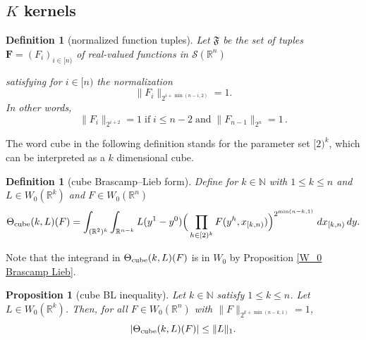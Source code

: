 \documentclass[12pt,reqno]{amsart}
\theoremstyle{plain}
\newtheorem{proposition}[theorem]{Proposition}
\newtheorem{definition}[theorem]{Definition}
\numberwithin{equation}{section}
\theoremstyle{remark}
\newcommand{\uses}[1]{}
\newcommand{\usesdefs}[1]{}
\newcommand{\R}{{\mathbb R}}
\newcommand{\N}{{\mathbb N}}
\newcommand{\F}{\mathbf{F}}
\begin{document}
\subsection{\texorpdfstring{$K$ kernels}{K kernels}}


\begin{definition}[normalized function tuples]\label{normalized function tuples}\uses{}\usesdefs{}
 Let $\mathfrak{F}$ be the set of tuples
$\F=(F_i)_{i\in [n)}$ of real-valued functions in $\mathcal{S}(\R^n)$


satisfying for $i\in [n)$ the normalization
 \begin{equation}\label{auto:normalized-function-tuple} \|F_{i}\|_{2^{i+\min(n-i,2)}}=1. \end{equation}
In other words,
 \begin{equation}\label{f-normalization}
  \|F_{i}\|_{2^{i+2}}=1\;\text{if}\;i\le n-2\;\text{and}\;\|F_{n-1}\|_{2^{n}}=1  \, .
 \end{equation}

\end{definition}


The word cube in the following definition stands for the parameter set $[2)^k$, which can be interpreted as a $k$ dimensional cube.

\begin{definition}[cube Brascamp--Lieb form]\label{cube Brascamp--Lieb}\uses{W_0 Brascamp Lieb}\usesdefs{auto:Wiener-space-definition}
Define for $k\in\N$ with $1 \le k\le  n$
and  $L\in W_0(\R^k)$ and $F\in W_0(\R^n)$
\begin{equation}\label{auto:cube-Brascamp-Lieb-form} \Theta_{{\rm cube}}(k,L)(F) = \int_{(\R^2)^k} \int_{\R^{n-k}} L(y^1-y^0) \Big(\prod_{h\in [2)^k} F(y^h, x_{[k,n)})\Big)^{2^{\min(n-k,1)}}\;dx_{[k,n)}\,dy.\end{equation}
\end{definition}
Note that the integrand in $\Theta_{{\rm cube}}(k, L)(F)$ is in $W_0$ by Proposition \ref{W_0 Brascamp Lieb}.


\begin{proposition}[cube BL inequality]\label{cube BL inequality}\uses{}\usesdefs{auto:Wiener-space-definition,cube Brascamp--Lieb}
Let $k\in\N$ satisfy $1 \le k\le n$.  Let $L\in W_0(\R^k)$. Then, for all $F\in W_0(\R^n)$ with $\|F\|_{2^{k+\min(n-k,1)}}=1$,
\begin{equation}\label{cube-k-m-bound}
   |\Theta_{\rm cube}(k,L)(F)| \le\|L\|_1 .
\end{equation}
\end{proposition}
\end{document}
